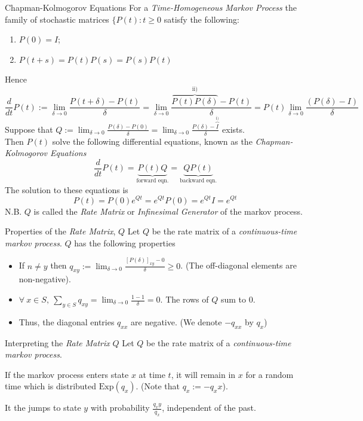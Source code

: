 \documentclass[11pt,a4paper]{article}
\begin{document}
\begin{definition}{Chapman-Kolmogorov Equations}
  For a \textit{Time-Homogeneous Markov Process} the family of stochastic matrices $\{P(t):t\geq0$ satisfy the following:
  \begin{enumerate}
    \item $P(0)=I$;
    \item $P(t+s)=P(t)P(s)=P(s)P(t)$
  \end{enumerate}
  Hence
  \[ \frac{d}{dt}P(t):=\lim_{\delta\to0}\frac{P(t+\delta)-P(t)}\delta=\lim_{\delta\to0}\frac{\overbrace{P(t)P(\delta)}^\text{ii)}-P(t)}\delta=P(t)\lim_{\delta\to0}\frac{(P(\delta)-I)}\delta \]
  Suppose that $Q:=\displaystyle\lim_{\delta\to0}\frac{P(\delta)-P(0)}\delta=\lim_{\delta\to0}\frac{P(\delta)-\overbrace{I}^\text{i)}}\delta$ exists.\\
  Then $P(t)$ solve the following differential equations, known as the \textit{Chapman-Kolmogorov Equations}
  \[ \frac{d}{dt}P(t)=\underbrace{P(t)Q}_\text{forward eqn.}=\underbrace{QP(t)}_\text{backward eqn.} \]
  The solution to these equations is
  \[ P(t)=P(0)e^{Qt}=e^{Qt}P(0)=e^{Qt}I=e^{Qt} \]
  N.B. $Q$ is called the \textit{Rate Matrix} or \textit{Infinesimal Generator} of the markov process.
\end{definition}

\begin{proposition}{Properties of the \textit{Rate Matrix}, $Q$}
  Let $Q$ be the rate matrix of a \textit{continuous-time markov process}. $Q$ has the following properties
  \begin{itemize}
    \item If $n\neq y$ then $\displaystyle q_{xy}:=\lim_{\delta\to0}\frac{[P(\delta)]_{xy}-0}\delta\geq0$. (The off-diagonal elements are non-negative).
    \item $\displaystyle\forall\ x\in S,\ \sum_{y\in S}q_{xy}=\lim_{\delta\to0}\frac{1-1}\delta=0$. The rows of $Q$ sum to 0.
    \item Thus, the diagonal entries $q_{xx}$ are negative. (We denote $-q_{xx}$ by $q_x$)
  \end{itemize}
\end{proposition}

\begin{proposition}{Interpreting the \textit{Rate Matrix} $Q$}
  Let $Q$ be the rate matrix of a \textit{continuous-time markov process}.
  \par If the markov process enters state $x$ at time $t$, it will remain in $x$ for a random time which is distributed $\text{Exp}(q_x)$. (Note that $q_x:=-q_xx$).
  \par It the jumps to state $y$ with probability   $\frac{q_xy}{q_x}$, independent of the past.
\end{proposition}
\end{document}
